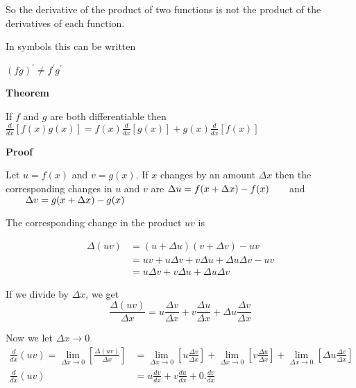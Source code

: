 So the derivative of the product of two functions is not the product
of the derivatives of each function. 

In symbols this can be written 


\begin{center}
$\left (f g\right )^{ \prime } \neq f^{ \prime } g^{ \prime }$
\end{center}\par
\textbf{Theorem} 

If $f$ and $g$ are both differentiable then $\frac{d}{d x} \left [f (x) g (x)\right ] =f (x) \frac{d}{d x} \left [g (x)\right ] +g (x) \frac{d}{d x} \left [f (x)\right ]$ 

\textbf{Proof} 

Let $u =f (x)$ and $v =g (x)$. If $x$ changes by an amount $ \Delta x$ then the corresponding changes in $u$ and $v$ are $ \Delta u =f (x + \Delta x) -f (x)\text{\quad \quad }$and$\text{\quad \quad } \Delta v =g (x + \Delta x) -g (x)$ 

The corresponding change in the product $u v$ is 


\begin{align*} \Delta (u v) &  = \left (u + \Delta u\right ) \left (v + \Delta v\right ) -u v \\
 &  = u v +u  \Delta v +v  \Delta u + \Delta u  \Delta v -u v \\
 &  = u  \Delta v +v  \Delta u + \Delta u  \Delta v\end{align*}

If we divide by $ \Delta x$, we get
\begin{equation*}\frac{ \Delta (u v)}{ \Delta x} =u \frac{ \Delta v}{ \Delta x} +v \frac{ \Delta u}{ \Delta x} + \Delta u \frac{ \Delta v}{ \Delta x}
\end{equation*}

Now we let $ \Delta x \rightarrow 0$
\begin{align*}\underset{}{\frac{d}{d x} \left (u v\right ) =\underset{ \Delta x \rightarrow 0}{\lim }} \genfrac{[}{]}{}{}{ \Delta (u v)}{ \Delta x} &  = \underset{ \Delta x \rightarrow 0}{\lim }\left [u \frac{ \Delta v}{ \Delta x}\right ] +\underset{}{\underset{ \Delta x \rightarrow 0}{\lim }\left [v \frac{ \Delta u}{ \Delta x}\right ]} +\underset{}{\underset{ \Delta x \rightarrow 0}{\lim }\left [ \Delta u \frac{ \Delta v}{ \Delta x}\right ]} \\
\frac{d}{d x} (u v) &  = u \frac{d v}{d x} +v \frac{d u}{d x} +0. \frac{d v}{d x}\end{align*}

